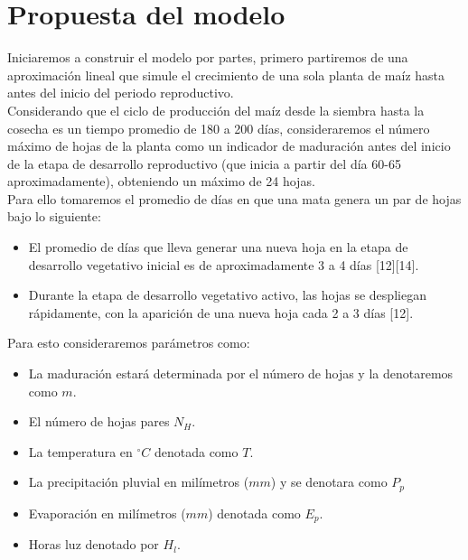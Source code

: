 \documentclass[utf8]{FrontiersinHarvard} %
\begin{document}
\section{Propuesta del modelo}
Iniciaremos a construir el modelo por partes, primero partiremos de una aproximación lineal que simule el crecimiento de una sola planta de maíz hasta antes del inicio del periodo reproductivo.
\\
Considerando que el ciclo de producción del maíz desde la siembra hasta la cosecha es un tiempo promedio de 180 a 200 días, consideraremos el número máximo de hojas de la planta como un indicador de maduración antes del inicio de la etapa de desarrollo reproductivo (que inicia a partir del día 60-65 aproximadamente), obteniendo un máximo de 24 hojas.
\\Para ello tomaremos el promedio de días en que una mata genera un par de hojas bajo lo siguiente:
\begin{itemize}
    \item El promedio de días que lleva generar una nueva hoja en la etapa de desarrollo vegetativo inicial es de aproximadamente 3 a 4 días [12][14]. 
    \item Durante la etapa de desarrollo vegetativo activo, las hojas se despliegan rápidamente, con la aparición de una nueva hoja cada 2 a 3 días [12].
    
\end{itemize}
Para esto consideraremos parámetros como:
\begin{itemize}
    \item 	La maduración estará determinada por el número de hojas y la denotaremos como $m$. 
    \item 	El número de hojas pares $N_H$.
    \item 	La temperatura en $^{\circ}C$ denotada como $T$.
    \item 	La precipitación pluvial en milímetros ($mm$) y se denotara como $P_p$ 
    \item 	Evaporación en milímetros ($mm$) denotada como $E_p$.
    \item 	Horas luz denotado por $H_l$.
\end{itemize}
\end{document}
